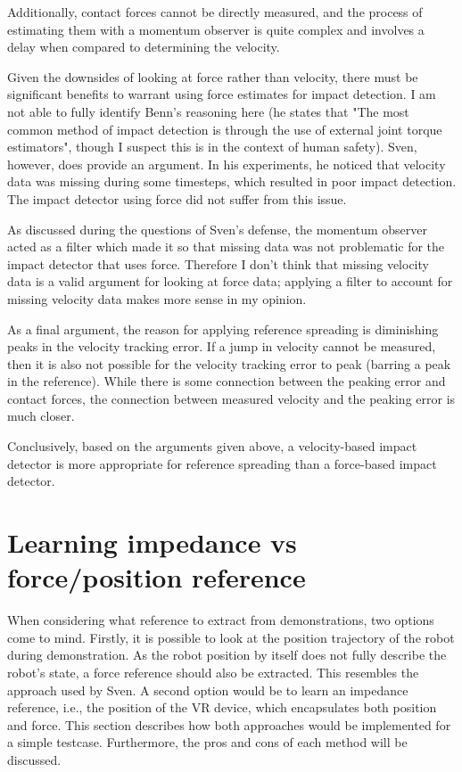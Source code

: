 \documentclass[11pt]{report}
\numberwithin{equation}{section}        %
\numberwithin{figure}{section}          %
\numberwithin{table}{section}           %
\begin{document}
  Additionally, contact forces cannot be directly measured, and the process of estimating them with a momentum observer is quite complex and involves a delay when compared to determining the velocity. 

  Given the downsides of looking at force rather than velocity, there must be significant benefits to warrant using force estimates for impact detection. I am not able to fully identify Benn's reasoning here (he states that "The most common method of impact detection is through the use of external joint torque estimators", though I suspect this is in the context of human safety). Sven, however, does provide an argument. In his experiments, he noticed that velocity data was missing during some timesteps, which resulted in poor impact detection. The impact detector using force did not suffer from this issue.

  As discussed during the questions of Sven's defense, the momentum observer acted as a filter which made it so that missing data was not problematic for the impact detector that uses force. Therefore I don't think that missing velocity data is a valid argument for looking at force data; applying a filter to account for missing velocity data makes more sense in my opinion.

  As a final argument, the reason for applying reference spreading is diminishing peaks in the velocity tracking error. If a jump in velocity cannot be measured, then it is also not possible for the velocity tracking error to peak (barring a peak in the reference). While there is some connection between the peaking error and contact forces, the connection between measured velocity and the peaking error is much closer.

  Conclusively, based on the arguments given above, a velocity-based impact detector is more appropriate for reference spreading than a force-based impact detector.
  
  \newpage

  \section{Learning impedance vs force/position reference}
  When considering what reference to extract from demonstrations, two options come to mind. Firstly, it is possible to look at the position trajectory of the robot during demonstration. As the robot position by itself does not fully describe the robot's state, a force reference should also be extracted. This resembles the approach used by Sven. A second option would be to learn an impedance reference, i.e., the position of the VR device, which encapsulates both position and force. This section describes how both approaches would be implemented for a simple testcase. Furthermore, the pros and cons of each method will be discussed. 
\end{document}
